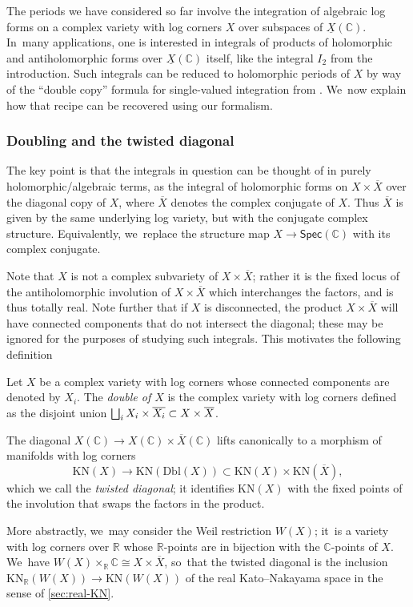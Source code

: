 \documentclass[JEP,XML,SOM,Unicode,NoFloatCountersInSection,published]{cedram}
\let\oldbigsqcup\bigsqcup
\renewcommand{\bigsqcup}{\mathop{\textstyle\oldbigsqcup}\displaylimits}
\theoremstyle{definition}
\theoremstyle{remark}
\newenvironment{remark}
  {\pushQED{\qed}\renewcommand{\qedsymbol}{$\lozenge$}\remarkx}
  {\popQED\endremarkx}
\let\defn\emph
\newcommand{\CC}{\mathbb{C}}
\newcommand{\RR}{\mathbb{R}}
\newcommand{\rbrac}[1]{\left(#1\right)}
\newcommand{\cX}{\overline{X}}
\newcommand{\uX}{\underline{X}}
\newcommand{\KN}[1]{\mathrm{KN}(#1)}
\newcommand{\KNR}[1]{\mathrm{KN}_\RR\rbrac{#1}}
\newcommand{\Spec}[1]{\mathsf{Spec}(#1)}
\newcommand{\Dbl}[1]{\mathrm{Dbl}(#1)}
\begin{document}
The periods we have considered so far involve the integration of algebraic log forms on a complex variety with log corners $X$ over subspaces of $\uX(\CC)$. In~many applications, one is interested in integrals of products of holomorphic and antiholomorphic forms over $\uX(\CC)$ itself, like the integral $I_2$ from the introduction. Such integrals can be reduced to holomorphic periods of $X$ by way of the ``double copy'' formula for single-valued integration from \cite{BrownDupont}. We~now explain how that recipe can be recovered using our formalism.

\subsubsection{Doubling and the twisted diagonal}
The key point is that the integrals in question can be thought of in purely holomorphic/algebraic terms, as the integral of holomorphic forms on $X \times \overline{X}$ over the diagonal copy of $X$, where $\overline{X}$ denotes the complex conjugate of $X$. Thus $\overline{X}$ is given by the same underlying log variety, but with the conjugate complex structure. Equivalently, we~replace the structure map $X \to \Spec{\CC}$ with its complex conjugate.

Note that $X$ is not a complex subvariety of $X \times \cX$; rather it is the fixed locus of the antiholomorphic involution of $X \times \overline{X}$ which interchanges the factors, and is thus totally real. Note further that if $X$ is disconnected, the product $X \times\overline{X}$ will have connected components that do not intersect the diagonal; these may be ignored for the purposes of studying such integrals. This motivates the following definition
\begin{definition}
Let $X$ be a complex variety with log corners whose connected components are denoted by $X_i$. The \defn{double of $X$} is the complex variety with log corners defined as the disjoint union $\bigsqcup_i X_i\times \overline{X_i} \subset X\times\cX$.
\end{definition}

The diagonal $X(\CC) \to X(\CC) \times \cX(\CC)$ lifts canonically to a morphism of manifolds with log corners
\[
\KN{X} \to \KN{\Dbl{X}} \subset \KN{X} \times \KN{\cX},
\]
which we call the \defn{twisted diagonal}; it identifies $\KN{X}$ with the fixed points of the involution that swaps the factors in the product.

\begin{remark}
More abstractly, we~may consider the Weil restriction $W(X)$; it~is a variety with log corners over $\RR$ whose $\RR$-points are in bijection with the $\CC$-points of $X$. We~have $W(X)\times_\RR\CC \cong X \times \cX$, so~that the twisted diagonal is the inclusion $\KNR{W(X)} \to \KN{W(X)}$ of the real Kato--Nakayama space in the sense of \autoref{sec:real-KN}.
\end{remark}
\end{document}
